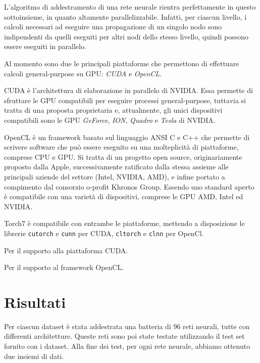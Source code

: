L'algoritmo di addestramento di una rete neurale rientra perfettamente in questo
sottoinsieme, in quanto altamente parallelizzabile. Infatti, per ciascun livello,
i calcoli necessari ad eseguire una propagazione di un singolo nodo sono indipendenti
da quelli eseguiti per altri nodi dello stesso livello, quindi possono essere
eseguiti in parallelo.

Al momento sono due le principali piattaforme che permettono di effettuare calcoli
general-purpose su GPU: \emph{CUDA} e \emph{OpenCL}.

CUDA \`e l'architettura di elaborazione in parallelo di NVIDIA.
Essa permette di sfruttare le GPU compatibili per eseguire processi general-purpose,
tuttavia si tratta di una proposta proprietaria e, attualmente, gli unici dispositivi
compatibili sono le GPU \emph{GeForce}, \emph{ION}, \emph{Quadro} e \emph{Tesla}
di NVIDIA.

OpenCL \`e un framework basato sul linguaggio ANSI C e C++ che permette di scrivere
software che pu\`o essere eseguito su una molteplicit\`a di piattaforme, comprese
CPU e GPU. Si tratta di un progetto open source, originariamente proposto dalla
Apple, successivamente ratificato dalla stessa assieme alle principali aziende
del settore (Intel, NVIDIA, AMD), e infine portato a compimento dal consorzio
o-profit Khronos Group. Essendo uno standard aperto \`e compatibile con una
variet\`a di dispositivi, comprese le GPU AMD, Intel ed NVIDIA.

Torch7 \`e compatibile con entrambe le piattaforme, mettendo a disposizione le
librerie \texttt{cutorch} e \texttt{cunn} per CUDA, \texttt{cltorch} e \texttt{clnn}
per OpenCl.



Per il supporto alla piattaforma CUDA.



Per il supporto al framework OpenCL.

\section{Risultati}

Per ciascun dataset \`e stata addestrata una batteria di 96 reti neurali, tutte
con differenti architetture. Queste reti sono poi state testate utilizzando il
test set fornito con i dataset. Alla fine dei test, per ogni rete neurale,
abbiamo ottenuto due insiemi di dati.

